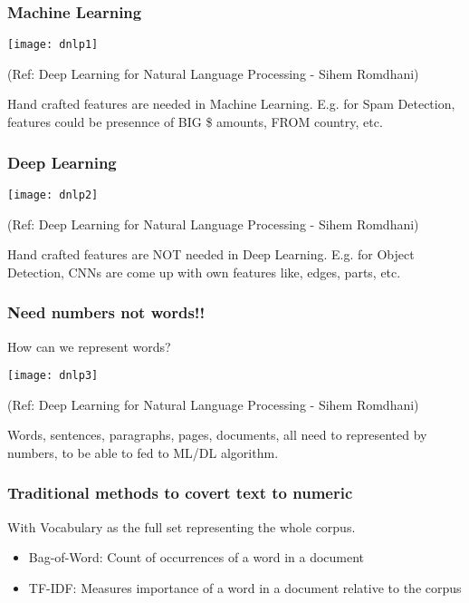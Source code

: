 \begin{frame}[fragile]\frametitle{Machine Learning}
\begin{center}
\texttt{[image: dnlp1]}

\tiny{(Ref:  Deep Learning for Natural Language Processing - Sihem Romdhani)}
\end{center}

Hand crafted features are needed in Machine Learning. E.g. for Spam Detection, features could be presennce of BIG \$ amounts, FROM country, etc.
\end{frame}

\begin{frame}[fragile]\frametitle{Deep Learning}
\begin{center}
\texttt{[image: dnlp2]}

\tiny{(Ref:  Deep Learning for Natural Language Processing - Sihem Romdhani)}
\end{center}

Hand crafted features are NOT needed in Deep Learning. E.g. for Object Detection, CNNs are come up with own features like, edges, parts, etc.
\end{frame}



\begin{frame}[fragile]\frametitle{Need numbers not words!!}
How can we represent words?
\begin{center}
\texttt{[image: dnlp3]}

\tiny{(Ref:  Deep Learning for Natural Language Processing - Sihem Romdhani)}
\end{center}

Words, sentences, paragraphs, pages, documents, all need to represented by numbers, to be able to fed to ML/DL algorithm.
\end{frame}

\begin{frame}[fragile]\frametitle{Traditional methods to covert text to numeric}
With Vocabulary as the full set representing the whole corpus.
	\begin{itemize}
	\item Bag-of-Word: Count of occurrences of a word in a document
	\item  TF-IDF: Measures importance of a word in a document relative to the corpus
	\end{itemize}

\end{frame}

